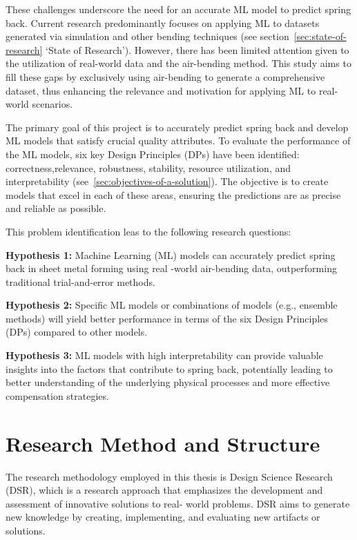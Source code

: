 These challenges underscore the need for an accurate ML model to predict spring back.
Current research predominantly focuses on applying ML to datasets generated via simulation and other bending
techniques (see section~\ref{sec:state-of-research} `State of Research').
However, there has been limited attention given to the utilization of real-world data and the air-bending method.
This study aims to fill these gaps by exclusively using air-bending to generate a comprehensive dataset, thus
enhancing the relevance and motivation for applying ML to real-world scenarios.

The primary goal of this project is to accurately predict spring back and develop \ac{ML} models that satisfy crucial
quality attributes.
To evaluate the performance of the ML models, six key Design Principles (DPs) have been identified:
correctness,relevance, robustness, stability, resource utilization, and interpretability
(see~\ref{sec:objectives-of-a-solution}).
The objective is to create models that excel in each of these areas, ensuring the predictions are as precise and
reliable as possible.

This problem identification leas to the following research questions:

\begin{tcolorbox}[arc=0pt,boxrule=0.5pt]
    \textbf{Hypothesis 1:} Machine Learning (ML) models can accurately predict spring back in sheet metal forming using
    real -world air-bending data, outperforming traditional trial-and-error methods.

    \textbf{Hypothesis 2:} Specific ML models or combinations of models (e.g., ensemble methods) will yield better
    performance
    in terms of the six Design Principles (DPs) compared to other models.

    \textbf{Hypothesis 3:} ML models with high interpretability can provide valuable insights into the factors that
    contribute to spring back, potentially leading to better understanding of the underlying physical processes and
    more effective compensation strategies.
\end{tcolorbox}


\section{Research Method and Structure}\label{sec:research-method-and-structure}
The research methodology employed in this thesis is Design Science Research (DSR), which is a
research approach that emphasizes the development and assessment of innovative solutions to real-
world problems.
DSR aims to generate new knowledge by creating, implementing, and evaluating new artifacts or
solutions.

